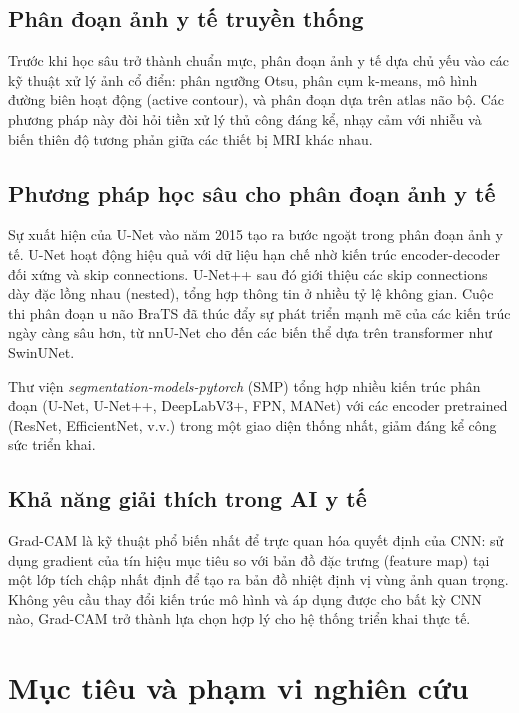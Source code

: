 \subsection{Phân đoạn ảnh y tế truyền thống}

Trước khi học sâu trở thành chuẩn mực, phân đoạn ảnh y tế dựa chủ yếu vào các kỹ thuật xử lý ảnh cổ điển: phân ngưỡng Otsu, phân cụm k-means, mô hình đường biên hoạt động (active contour), và phân đoạn dựa trên atlas não bộ. Các phương pháp này đòi hỏi tiền xử lý thủ công đáng kể, nhạy cảm với nhiễu và biến thiên độ tương phản giữa các thiết bị MRI khác nhau.

\subsection{Phương pháp học sâu cho phân đoạn ảnh y tế}

Sự xuất hiện của U-Net \cite{Ronneberger2015} vào năm 2015 tạo ra bước ngoặt trong phân đoạn ảnh y tế. U-Net hoạt động hiệu quả với dữ liệu hạn chế nhờ kiến trúc encoder-decoder đối xứng và skip connections. U-Net++ \cite{Zhou2018} sau đó giới thiệu các skip connections dày đặc lồng nhau (nested), tổng hợp thông tin ở nhiều tỷ lệ không gian. Cuộc thi phân đoạn u não BraTS \cite{Menze2015} đã thúc đẩy sự phát triển mạnh mẽ của các kiến trúc ngày càng sâu hơn, từ nnU-Net cho đến các biến thể dựa trên transformer như SwinUNet.

Thư viện \textit{segmentation-models-pytorch} (SMP) \cite{Yakubovskiy2019} tổng hợp nhiều kiến trúc phân đoạn (U-Net, U-Net++, DeepLabV3+, FPN, MANet) với các encoder pretrained (ResNet, EfficientNet, v.v.) trong một giao diện thống nhất, giảm đáng kể công sức triển khai.

\subsection{Khả năng giải thích trong AI y tế}

Grad-CAM \cite{Selvaraju2017} là kỹ thuật phổ biến nhất để trực quan hóa quyết định của CNN: sử dụng gradient của tín hiệu mục tiêu so với bản đồ đặc trưng (feature map) tại một lớp tích chập nhất định để tạo ra bản đồ nhiệt định vị vùng ảnh quan trọng. Không yêu cầu thay đổi kiến trúc mô hình và áp dụng được cho bất kỳ CNN nào, Grad-CAM trở thành lựa chọn hợp lý cho hệ thống triển khai thực tế.

\section{Mục tiêu và phạm vi nghiên cứu}

